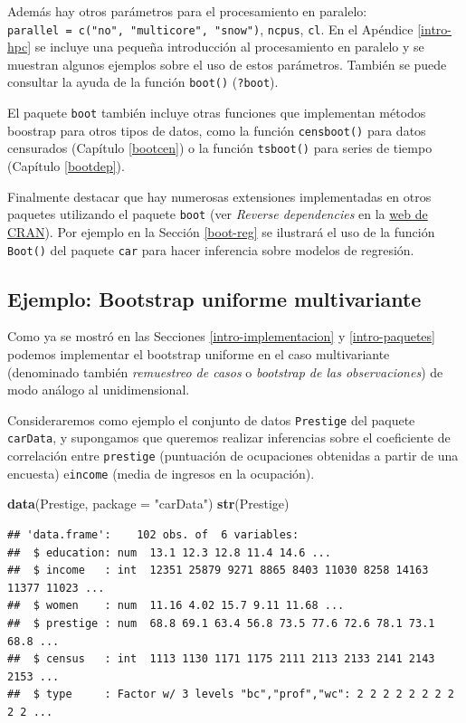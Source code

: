 \documentclass[
]{book}
\newenvironment{Shaded}{\begin{snugshade}}{\end{snugshade}}
\newcommand{\AttributeTok}[1]{\textcolor[rgb]{0.13,0.29,0.53}{#1}}
\newcommand{\FunctionTok}[1]{\textcolor[rgb]{0.13,0.29,0.53}{\textbf{#1}}}
\newcommand{\NormalTok}[1]{#1}
\newcommand{\StringTok}[1]{\textcolor[rgb]{0.31,0.60,0.02}{#1}}
\theoremstyle{break}
\theoremstyle{nonumberplain}
\begin{document}
Además hay otros parámetros para el procesamiento en paralelo: \texttt{parallel\ =\ c("no",\ "multicore",\ "snow")}, \texttt{ncpus}, \texttt{cl}.
En el Apéndice \ref{intro-hpc} se incluye una pequeña introducción al procesamiento en paralelo y se muestran algunos ejemplos sobre el uso de estos parámetros.
También se puede consultar la ayuda de la función \texttt{boot()} (\texttt{?boot}).

El paquete \texttt{boot} también incluye otras funciones que implementan métodos
boostrap para otros tipos de datos, como la función \texttt{censboot()} para datos
censurados (Capítulo \ref{bootcen}) o la función \texttt{tsboot()} para series de tiempo (Capítulo \ref{bootdep}).

Finalmente destacar que hay numerosas extensiones implementadas en otros paquetes utilizando el paquete \texttt{boot} (ver \emph{Reverse dependencies} en la \href{https://cran.r-project.org/package=boot}{web de CRAN}).
Por ejemplo en la Sección \ref{boot-reg} se ilustrará el uso de la función \texttt{Boot()} del paquete \texttt{car} para hacer inferencia sobre modelos de regresión.

\subsection{Ejemplo: Bootstrap uniforme multivariante}\label{boot-unif-multi}

Como ya se mostró en las Secciones \ref{intro-implementacion} y \ref{intro-paquetes} podemos implementar el bootstrap uniforme en el caso multivariante (denominado también \emph{remuestreo de casos} o \emph{bootstrap de las observaciones}) de modo análogo al unidimensional.

Consideraremos como ejemplo el conjunto de datos \texttt{Prestige} del paquete \texttt{carData}, y supongamos que queremos realizar inferencias sobre el coeficiente de correlación entre \texttt{prestige} (puntuación de ocupaciones obtenidas a partir de una encuesta) e\texttt{income} (media de ingresos en la ocupación).

\begin{Shaded}
\begin{Highlighting}[]
\FunctionTok{data}\NormalTok{(Prestige, }\AttributeTok{package =} \StringTok{"carData"}\NormalTok{)}
\FunctionTok{str}\NormalTok{(Prestige)}
\end{Highlighting}
\end{Shaded}

\begin{verbatim}
## 'data.frame':    102 obs. of  6 variables:
##  $ education: num  13.1 12.3 12.8 11.4 14.6 ...
##  $ income   : int  12351 25879 9271 8865 8403 11030 8258 14163 11377 11023 ...
##  $ women    : num  11.16 4.02 15.7 9.11 11.68 ...
##  $ prestige : num  68.8 69.1 63.4 56.8 73.5 77.6 72.6 78.1 73.1 68.8 ...
##  $ census   : int  1113 1130 1171 1175 2111 2113 2133 2141 2143 2153 ...
##  $ type     : Factor w/ 3 levels "bc","prof","wc": 2 2 2 2 2 2 2 2 2 2 ...
\end{verbatim}
\end{document}
